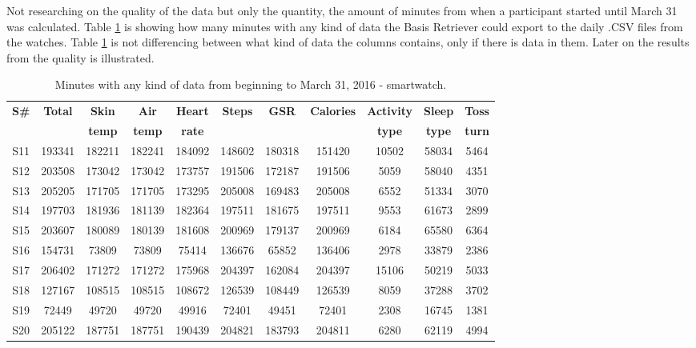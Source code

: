 \documentclass[12pt]{article} %
\begin{document}
Not researching on the quality of the data but only the quantity, the amount of minutes from when a participant started until March 31 was calculated. Table \ref{tab:totalMinutesWatch} is showing how many minutes with any kind of data the Basis Retriever could export to the daily .CSV files from the watches. Table \ref{tab:totalMinutesWatch} is not differencing between what kind of data the columns contains, only if there is data in them. Later on the results from the quality is illustrated. 

\begin{table}[H]
\center
\begin{footnotesize}
	\begin{tabular}{| c | c | c | c | c | c | c | c | c | c | c |}
	\hline
	\textbf{S\#} & \textbf{Total} & \textbf{Skin} & \textbf{Air} & \textbf{Heart} & \textbf{Steps} & \textbf{GSR} & \textbf{Calories} & \textbf{Activity} & \textbf{Sleep} & \textbf{Toss}\\
	 & & \textbf{temp} & \textbf{temp} & \textbf{rate} & & & & \textbf{type} & \textbf{type} & \textbf{turn}\\
	
	\hline
	S11 & 193341 & 182211 & 182241 & 184092 & 148602 & 180318 & 151420 & 10502 & 58034 & 5464\\
	\hline
	S12 & 203508 & 173042 & 173042 & 173757 & 191506 & 172187 & 191506 & 5059 & 58040 & 4351 \\
	\hline
	S13 & 205205 & 171705 & 171705 & 173295 & 205008 & 169483 & 205008 & 6552 & 51334 & 3070\\
	\hline
	S14 & 197703 & 181936 & 181139 & 182364 & 197511 & 181675 & 197511 & 9553 & 61673 & 2899 \\
	\hline
	S15 & 203607 & 180089 & 180139 & 181608 & 200969 & 179137 & 200969 & 6184 & 65580 & 6364 \\
	\hline
	S16 & 154731 & 73809 & 73809 & 75414 &136676 & 65852 & 136406 & 2978 & 33879 & 2386\\
	\hline
	S17 & 206402 & 171272 & 171272 & 175968 & 204397 & 162084 & 204397 & 15106 & 50219 & 5033\\
	\hline
	S18 & 127167 & 108515 &108515 & 108672 & 126539 & 108449 & 126539 & 8059 & 37288 & 3702 \\
	\hline
	S19 & 72449 & 49720 & 49720 & 49916 & 72401 & 49451 & 72401 & 2308 & 16745 & 1381 \\
	\hline
	S20 & 205122 & 187751 & 187751 & 190439 & 204821 & 183793 & 204811 & 6280 & 62119 & 4994\\
	\hline
	\end{tabular}
	\caption{Minutes with any kind of data from beginning to March 31, 2016 - smartwatch.}
	\label{tab:totalMinutesWatch}
\end{footnotesize}
\end{table}
\end{document}
